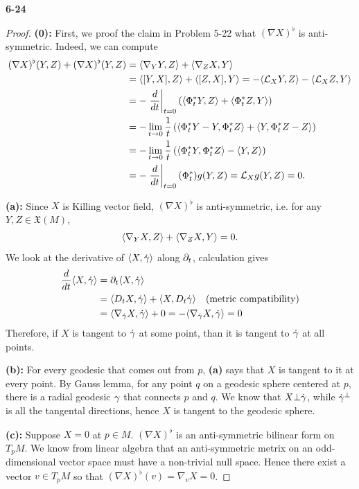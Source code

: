 \documentclass[11pt, a4paper]{article}
\theoremstyle{plain}
\theoremstyle{definition}
\theoremstyle{remark}
\begin{document}
\newpage
\noindent\textbf{6-24}
\newcommand{\at}[2]{\left. #1 \right|_{#2}}
\newcommand{\lie}[1]{\mathcal{L}_{#1}}
\newcommand{\nba}{\nabla}
\newcommand{\der}[2]{\left.\frac{d}{d#1}\right|_{#1 = #2}}
\begin{proof}
    \textbf{(0):} First, we proof the claim in Problem 5-22 what $(\nba X)^\flat$ is anti-symmetric. Indeed, we can compute
    \begin{align*}
        (\nba X)^\flat (Y,Z) + (\nba X)^\flat (Y,Z) &= \mt{\nba_Y Y,Z} + \mt{\nba_Z X,Y}\\
        &= \mt{[Y,X],Z} + \mt{[Z,X],Y} = - \mt{\lie{X} Y,Z} - \mt{\lie{X}Z ,Y}\\
        &= - \der{t}{0}\left( \mt{\Phi_t^* Y,Z} + \mt{\Phi_t^*Z,Y} \right)\\
        &= -\lim_{t\to 0}\frac{1}{t} \left(\mt{\Phi^*_t Y - Y , \Phi_t^* Z} + \mt{Y,\Phi_t^* Z - Z}\right)\\
        &= -\lim_{t\to 0}\frac{1}{t} \left(\mt{\Phi_t^* Y,\Phi_t^* Z} - \mt{Y,Z}\right)\\
        &= -\der{t}{0}(\Phi_t^*)g (Y,Z) = \lie{X} g (Y,Z) = 0.
    \end{align*}


    \textbf{(a):} Since $X$ is Killing vector field,  $(\nabla X)^\flat$ is anti-symmetric, i.e. for any $Y,Z\in\mathfrak{X}(M)$,
    \[\mt{\nba_YX,Z} + \mt{\nba_Z X,Y} = 0.\]
    We look at the derivative of $\langle X,\dot{\gamma} \rangle$ along $\partial_t$, calculation gives
    \begin{align*}
        \frac{d}{dt}\mt{X,\dgm} &= \p_t \mt{X,\dgm}\\
        &= \mt{D_t X,\dgm} + \mt{X, D_t\dgm}\quad\text{(metric compatibility)}\\
        &= \mt{\nba_{\dgm} X,\dgm} + 0 = -\mt{\nba_{\dgm} X,\dgm} = 0
    \end{align*}
    Therefore, if $X$ is tangent to $\dot{\gamma}$ at some point, than it is tangent to $\dot{\gamma}$ at all points.

    \textbf{(b):} For every geodesic that comes out from $p$, \textbf{(a)} says that $X$ is tangent to it at every point. By Gauss lemma,  for
    any point $q$ on a geodesic sphere centered at $p$, there is a radial geodesic $\gamma$ that connects $p$ and $q$. We know that
    $X\bot \dot{\gamma}$, while $\dot{\gamma}^\bot$ is all the tangental directions, hence $X$ is tangent to the geodesic sphere.
    
    \textbf{(c):} Suppose $X = 0$ at $p\in M$. $(\nba X)^\flat$ is an anti-symmetric bilinear form on $T_p M$.  We know from linear algebra that an anti-symmetric metrix on an odd-dimensional vector space must have a non-trivial
    null space. Hence there exist a vector $v\in T_p M$ so that $(\nba X)^\flat (v) = \nba_v X = 0$.


\end{proof}
\end{document}
